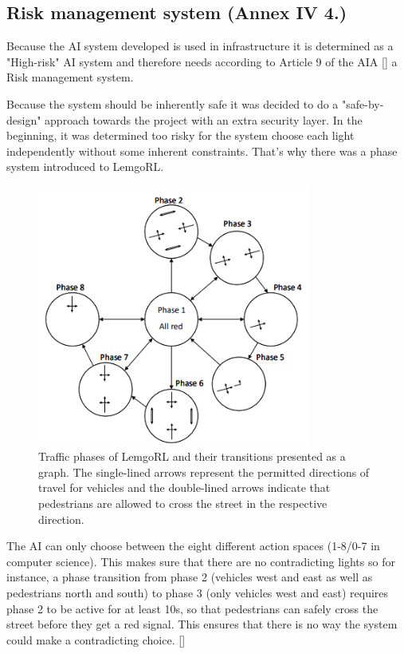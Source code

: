   \subsection{Risk management system (Annex IV 4.)}
Because the AI system developed is used in infrastructure it is determined as a "High-risk" AI system and therefore needs according to Article 9 of the AIA [\citet{ai_act}] a Risk management system.

Because the system should be inherently safe it was decided to do a "safe-by-design" approach towards the project with an extra security layer.
In the beginning, it was determined too risky for the system choose each light independently without some inherent constraints. That's why there was a phase system introduced to LemgoRL.

\begin{figure}[h]
        \centering
        \includegraphics[width=0.8\textwidth]{paper-template/figs/risk_management_2.png}
        \caption{Traffic phases of LemgoRL and their transitions presented as a graph. The single-lined arrows represent the permitted directions of travel for vehicles and the double-lined arrows indicate that pedestrians are allowed to cross the street in the respective direction.}
        \label{fig:my_label}
    \end{figure}
The AI can only choose between the eight different action spaces (1-8/0-7 in computer science). This makes sure that there are no contradicting lights so for instance, a phase transition from phase 2 (vehicles west and east as well as pedestrians north and south) to phase 3 (only vehicles west and east) requires phase 2 to be active for at least 10s, so that pedestrians can safely cross the street before they get a red signal. This ensures that there is no way the system could make a contradicting choice. [\citet{traffic_signal_control_with_rl}]


